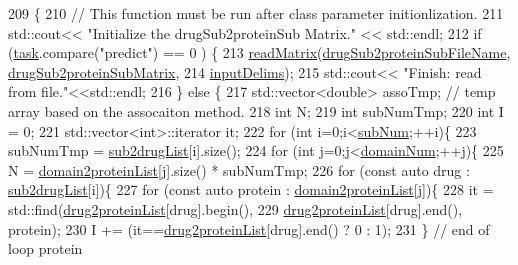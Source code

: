\begin{DoxyCode}
209                                         \{
210     \textcolor{comment}{// This function must be run after class parameter initionlization.}
211     std::cout<< \textcolor{stringliteral}{"Initialize the drugSub2proteinSub Matrix."} << std::endl;
212     \textcolor{keywordflow}{if} (\hyperlink{classgift_1_1parameters_a59c1e1b83354be0dcc511743c4fe0cc1}{task}.compare(\textcolor{stringliteral}{"predict"}) == 0 ) \{
213       \hyperlink{namespacegift_a12372122de14f2490d34c339aa649ff5}{readMatrix}(\hyperlink{classgift_1_1parameters_a9a245f231438683010d85aa618bd6bd4}{drugSub2proteinSubFileName},
      \hyperlink{namespacegift_ae49d782c144d39543cd6504f5e7d9c7a}{drugSub2proteinSubMatrix},
214                  \hyperlink{classgift_1_1parameters_a35680722bd40ee2cb5434ca7736e9bac}{inputDelims});
215       std::cout<< \textcolor{stringliteral}{"Finish: read from file."}<<std::endl;
216     \} \textcolor{keywordflow}{else} \{
217       std::vector<double> assoTmp; \textcolor{comment}{// temp array based on the assocaiton method.}
218       \textcolor{keywordtype}{int} N;
219       \textcolor{keywordtype}{int} subNumTmp;
220       \textcolor{keywordtype}{int} I = 0;
221       std::vector<int>::iterator it;
222       \textcolor{keywordflow}{for} (\textcolor{keywordtype}{int} i=0;i<\hyperlink{classgift_1_1parameters_a3736b9054e162bc4bf63d018744ff0c3}{subNum};++i)\{
223         subNumTmp = \hyperlink{namespacegift_afcc3e6429fa4fef47fb34e30d2f0c6c4}{sub2drugList}[i].size();
224         \textcolor{keywordflow}{for} (\textcolor{keywordtype}{int} j=0;j<\hyperlink{classgift_1_1parameters_ae968d9a2aeb5742488810b3f7aa8b098}{domainNum};++j)\{
225           N = \hyperlink{namespacegift_ac99bcb1b736637f97e82be7503c725b5}{domain2proteinList}[j].size() * subNumTmp;
226           \textcolor{keywordflow}{for} (\textcolor{keyword}{const} \textcolor{keyword}{auto} drug : \hyperlink{namespacegift_afcc3e6429fa4fef47fb34e30d2f0c6c4}{sub2drugList}[i])\{
227             \textcolor{keywordflow}{for} (\textcolor{keyword}{const} \textcolor{keyword}{auto} protein : \hyperlink{namespacegift_ac99bcb1b736637f97e82be7503c725b5}{domain2proteinList}[j])\{
228               it = std::find(\hyperlink{namespacegift_a2c0005015565d7432dd64fd6bafd3395}{drug2proteinList}[drug].begin(),
229                              \hyperlink{namespacegift_a2c0005015565d7432dd64fd6bafd3395}{drug2proteinList}[drug].end(), protein);
230               I += (it==\hyperlink{namespacegift_a2c0005015565d7432dd64fd6bafd3395}{drug2proteinList}[drug].end() ? 0 : 1);
231             \} \textcolor{comment}{// end of loop protein}

\end{DoxyCode}
